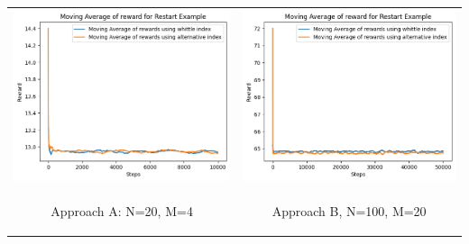 \documentclass{slides}
\begin{document}
{{%
\begin{center}
\begin{tabular}{cc}
\includegraphics[scale=0.6]{comparison_A_homo_restart.png} &
\includegraphics[scale=0.6]{Moving Average of reward for Restart Example_final.png} \\
\begin{small}
 Approach A: N=20, M=4\end{small} & \begin{small}Approach B, N=100, M=20\end{small}\\

\end{tabular}
\end{center}}}
\end{document}
